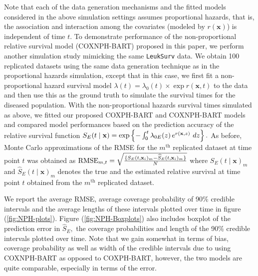 \documentclass[12pt]{article}
\newcommand{\bfx}{{\bf x}}
\begin{document}
Note that each of the data generation mechanisms and the fitted models considered in the above simulation settings assumes proportional hazards, that is, the association and interaction among the covariates (modeled by $r(\mathbf{x})$) is independent of time $t$. To demonstrate performance of the non-proportional relative survival model (COXNPH-BART) proposed in this paper, we perform another simulation study mimicking the same \texttt{LeukSurv} data. We obtain 100 replicated datasets using the same data generation technique as in the proportional hazards simulation, except that in this case, we first fit a non-proportional hazard survival model $\lambda(t) = \lambda_0(t) \times \exp{r( \mathbf{x}, t)}$ to the data and then use this as the ground truth to simulate the survival times for the diseased population. With the non-proportional hazards survival times simulated as above, we fitted our proposed COXPH-BART and COXNPH-BART models and compared model performances based on the prediction accuracy of the relative survival function $S_E(t \mid \bfx) = \exp\left\{-\int_0^t \lambda_{0E}(z) \, e^{r(\bfx,z)} \ dz\right\}.$ As before, Monte Carlo approximations of the RMSE for the $m^{\text{th}}$ replicated dataset at time point $t$ was obtained as $\text{RMSE}_{m,t} = \sqrt{\frac{\{S_E(t, \bfx_i)_m - \widehat S_E(t, \bfx_i)_m\}}{N}}$ where $S_E(t \mid \mathbf{x})_m$ and $\widehat{S}_E(t \mid \mathbf{x})_m$ denotes the true and the estimated relative survival at time point $t$ obtained from the $m^{\text{th}}$ replicated dataset. 

We report the average RMSE, average coverage probability of 90\% credible intervals and the average lengths of these intervals plotted over time in figure (\ref{fig:NPH-plots}). Figure (\ref{fig:NPH-Boxplots}) also includes boxplot of the prediction error in $\widehat{S}_E,$ the coverage probabilities and length of the 90\% credible intervals plotted over time. Note that we gain somewhat in terms of bias, coverage probability as well as width of the credible intervals due to using COXNPH-BART as opposed to COXPH-BART, however, the two models are quite comparable, especially in terms of the error. 
\end{document}
